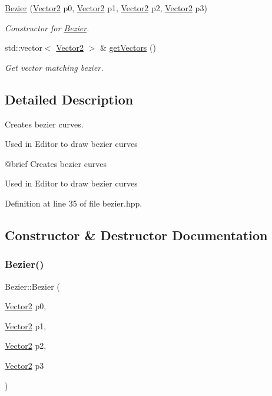 \begin{DoxyCompactItemize}
\mbox{\hyperlink{classBezier_aeee0e41ed64d1a61d7ac103d2300093b}{Bezier}} (\mbox{\hyperlink{classVector2}{Vector2}} p0, \mbox{\hyperlink{classVector2}{Vector2}} p1, \mbox{\hyperlink{classVector2}{Vector2}} p2, \mbox{\hyperlink{classVector2}{Vector2}} p3)
\begin{DoxyCompactList}\small\item\em Constructor for \mbox{\hyperlink{classBezier}{Bezier}}. \end{DoxyCompactList}\item 
std\+::vector$<$ \mbox{\hyperlink{classVector2}{Vector2}} $>$ \& \mbox{\hyperlink{classBezier_a26bf332b0c831e0f302f1d72ec782436}{get\+Vectors}} ()
\begin{DoxyCompactList}\small\item\em Get vector matching bezier. \end{DoxyCompactList}\end{DoxyCompactItemize}


\subsection{Detailed Description}
Creates bezier curves. 

Used in Editor to draw bezier curves

@brief Creates bezier curves

Used in Editor to draw bezier curves 

Definition at line 35 of file bezier.\+hpp.



\subsection{Constructor \& Destructor Documentation}
\mbox{\label{classBezier_aeee0e41ed64d1a61d7ac103d2300093b}} 
\subsubsection{\texorpdfstring{Bezier()}{Bezier()}\hspace{0.1cm}{\footnotesize\ttfamily [1/2]}}
{\footnotesize\ttfamily Bezier\+::\+Bezier (\begin{DoxyParamCaption}\item[{\mbox{\hyperlink{classVector2}{Vector2}}}]{p0,  }\item[{\mbox{\hyperlink{classVector2}{Vector2}}}]{p1,  }\item[{\mbox{\hyperlink{classVector2}{Vector2}}}]{p2,  }\item[{\mbox{\hyperlink{classVector2}{Vector2}}}]{p3 }\end{DoxyParamCaption})}




